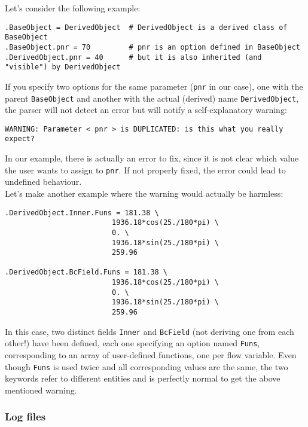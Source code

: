 \documentclass[11pt]{article}
\begin{document}
Let's consider the following example:
\vspace{-0.2cm}
\begin{verbatim}
.BaseObject = DerivedObject  # DerivedObject is a derived class of BaseObject
.BaseObject.pnr = 70         # pnr is an option defined in BaseObject
.DerivedObject.pnr = 40      # but it is also inherited (and "visible") by DerivedObject 
\end{verbatim}
If you specify two options for the same parameter (\texttt{pnr} in our
case), one with the parent \texttt{BaseObject} and another with the actual
(derived) name \texttt{DerivedObject}, the parser will not detect an error but 
will notify a self-explanatory warning:
\vspace{-0.2cm}
\small
\begin{verbatim}
WARNING: Parameter < pnr > is DUPLICATED: is this what you really expect?
\end{verbatim}
In our example, there is actually an error to fix, since it is not
clear which value the user wants to assign to \texttt{pnr}. If not
properly fixed, the error could lead to undefined behaviour. \\
Let's make another example where the warning would actually be harmless:
\vspace{-0.2cm}
\begin{verbatim}
.DerivedObject.Inner.Funs = 181.38 \
                         1936.18*cos(25./180*pi) \
                         0. \
                         1936.18*sin(25./180*pi) \
                         259.96

.DerivedObject.BcField.Funs = 181.38 \
                         1936.18*cos(25./180*pi) \
                         0. \
                         1936.18*sin(25./180*pi) \
                         259.96
\end{verbatim}
In this case, two distinct fields \texttt{Inner} and
\texttt{BcField} (not deriving one from each other!)
have been defined, each one specifying an option named \texttt{Funs},
corresponding to an array of user-defined functions, one per flow 
variable. Even though \texttt{Funs} is used twice and all 
corresponding values are the same, the two keywords refer to 
different entities and is perfectly normal to get the above
mentioned warning.

\subsubsection{Log files}\label{sssec:logfiles}
\end{document}

